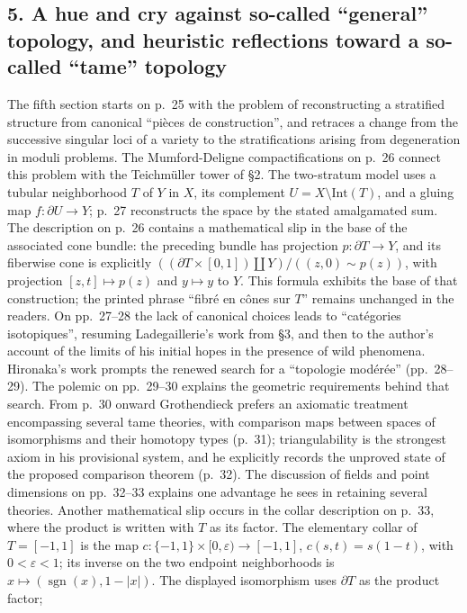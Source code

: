 \subsection*{5. A hue and cry against so-called ``general'' topology, and heuristic reflections toward a so-called ``tame'' topology}
The fifth section starts on p.~25 with the problem of reconstructing a
stratified structure from canonical ``pièces de construction'', and
retraces a change from the successive singular loci of a variety to the
stratifications arising from degeneration in moduli problems. The
Mumford-Deligne compactifications on p.~26 connect this problem with the
Teichmüller tower of \S2. The two-stratum model uses a tubular neighborhood
$T$ of $Y$ in $X$, its complement $U=X\setminus\mathrm{Int}(T)$, and a
gluing map $f:\partial U\longrightarrow Y$; p.~27 reconstructs the space
by the stated amalgamated sum. The description on p.~26 contains a
mathematical slip in the base of the associated cone bundle: the preceding
bundle has projection $p:\partial T\longrightarrow Y$, and its fiberwise
cone is explicitly
$((\partial T\times[0,1])\amalg Y)/((z,0)\sim p(z))$,
with projection $[z,t]\mapsto p(z)$ and $y\mapsto y$ to $Y$.
This formula exhibits the base of that construction; the printed phrase
``fibré en cônes sur $T$'' remains unchanged in the readers. On pp.~27--28
the lack of canonical choices leads to ``catégories isotopiques'',
resuming Ladegaillerie's work from \S3, and then to the author's account
of the limits of his initial hopes in the presence of wild phenomena.
Hironaka's work prompts the renewed search for a ``topologie modérée''
(pp.~28--29). The polemic on pp.~29--30 explains the geometric
requirements behind that search. From p.~30 onward Grothendieck prefers
an axiomatic treatment encompassing several tame theories, with
comparison maps between spaces of isomorphisms and their homotopy types
(p.~31); triangulability is the strongest axiom in his provisional system,
and he explicitly records the unproved state of the proposed comparison
theorem (p.~32). The discussion of fields and point dimensions on
pp.~32--33 explains one advantage he sees in retaining several theories.
Another mathematical slip occurs in the collar description on p.~33,
where the product is written with $T$ as its factor. The elementary collar
of $T=[-1,1]$ is the map
$c:\{-1,1\}\times[0,\varepsilon)\longrightarrow[-1,1]$,
$c(s,t)=s(1-t)$, with $0<\varepsilon<1$; its inverse on the two endpoint
neighborhoods is $x\mapsto(\operatorname{sgn}(x),1-|x|)$.
The displayed isomorphism uses $\partial T$ as the product factor;
